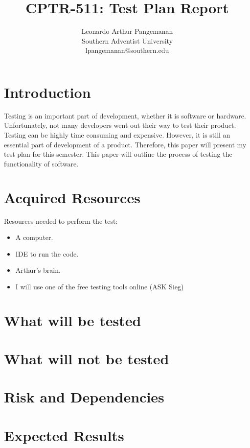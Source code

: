 \documentclass[pdf,bookmarks,colorlinks=true]{article}
\title{CPTR-511: Test Plan Report}
\author{Leonardo Arthur Pangemanan\\
	Southern Adventist University\\
	lpangemanan@southern.edu
}
\begin{document}
	\maketitle
	
	\section{Introduction}
		Testing is an important part of development, whether it is software or hardware. Unfortunately, not many developers went out their way to test their product. Testing can be highly time consuming and expensive. However, it is still an essential part of development of a product. Therefore, this paper will present my test plan for this semester. This paper will outline the process of testing the functionality of software.
	\section{Acquired Resources}
		Resources needed to perform the test:
			\begin{itemize}
				\item A computer.
				\item IDE to run the code.
				\item Arthur's brain.
				\item I will use one of the free testing tools online (ASK Sieg)
			\end{itemize}
	\section{What will be tested}
	\section{What will not be tested}
	\section{Risk and Dependencies}
	\section{Expected Results}
	
\end{document}
